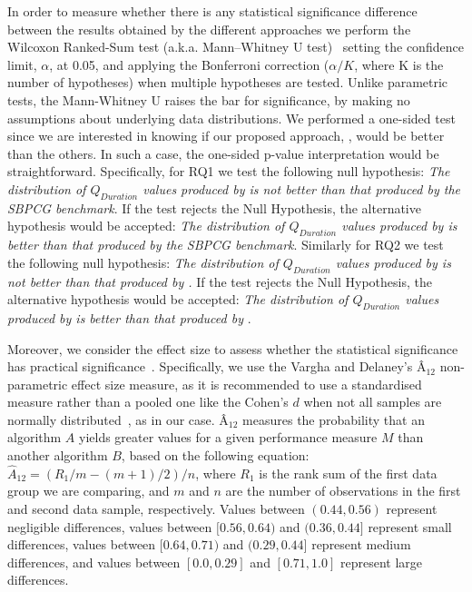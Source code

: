 In order to measure whether there is any statistical significance difference between the results obtained by the different approaches we perform the  Wilcoxon Ranked-Sum test (a.k.a. Mann–Whitney U test)~\cite{mann1947test} setting the confidence limit, $\alpha$, at 0.05, and applying the Bonferroni correction ($\alpha/K$, where K is the number of hypotheses) when multiple hypotheses are tested.  Unlike parametric tests, the Mann-Whitney U raises the bar for significance, by making no assumptions about underlying data distributions. We performed a one-sided test since we are interested in knowing if our proposed approach, \simhotep{}, would be better than the others. In such a case, the one-sided p-value interpretation would be straightforward. Specifically, for RQ1 we test the following null hypothesis: \textit{The distribution of $Q_{Duration}$ values produced by  \simhotep{}  is not better than that produced by the SBPCG benchmark}. If the test rejects the Null Hypothesis, the alternative hypothesis would be accepted: \textit{The distribution of $Q_{Duration}$ values produced by \simhotep{} is better than that produced by the SBPCG benchmark}. Similarly for RQ2 we test the following null hypothesis: \textit{The distribution of $Q_{Duration}$ values produced by  \simhotep{}  is not better than that produced by \timhotep{}.} If the test rejects the Null Hypothesis, the alternative hypothesis would be accepted: \textit{The distribution of $Q_{Duration}$ values produced by \simhotep{}  is better than that produced by \timhotep{}}.

Moreover, we consider the effect size to assess whether the statistical significance has practical significance~\cite{Arcuri2014}. Specifically, we use the Vargha and Delaney's Â$_{12}$ non-parametric effect size measure, as it is recommended to use a standardised measure rather than a pooled one like the Cohen's $d$ when not all samples are normally distributed~\cite{Arcuri2014}, as in our case.   Â$_{12}$ measures the probability that an algorithm $A$ yields greater values for a given performance measure $M$ than another algorithm $B$, based on the following equation: 	$\hat{A}_{12} = (R_1/m - (m + 1)/2)/n$, where $R_1$ is the rank sum of the first data group we are comparing, and $m$ and $n$ are the number of observations in the first and second data sample, respectively. Values between $(0.44, 0.56)$ represent negligible differences, values between $[0.56, 0.64)$ and $(0.36, 0.44]$ represent small differences, values between $[0.64, 0.71)$ and $(0.29, 0.44]$ represent medium differences, and values between $[0.0, 0.29]$ and $[0.71, 1.0]$ represent large differences.

